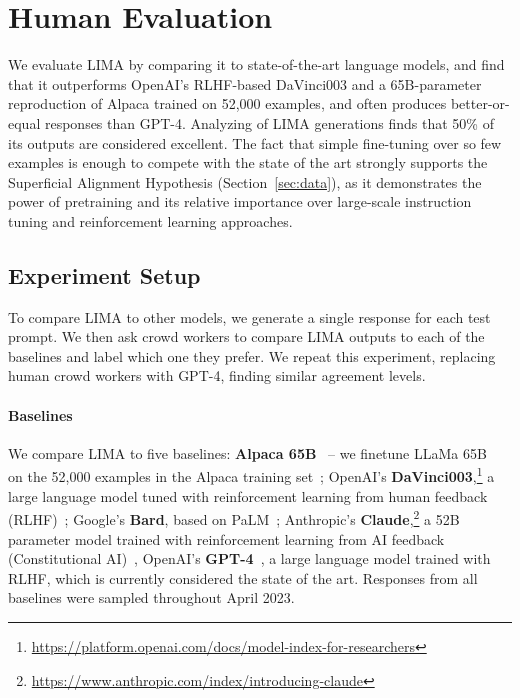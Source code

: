 \documentclass{article}
\newcommand\hypothesis{Superficial Alignment Hypothesis}
\begin{document}
\section{Human Evaluation}

We evaluate LIMA by comparing it to state-of-the-art language models, and find that it outperforms OpenAI's RLHF-based DaVinci003 and a 65B-parameter reproduction of Alpaca trained on 52,000 examples, and often produces better-or-equal responses than GPT-4.
Analyzing of LIMA generations finds that 50\% of its outputs are considered excellent.
The fact that simple fine-tuning over so few examples is enough to compete with the state of the art strongly supports the \hypothesis{} (Section~\ref{sec:data}), as it demonstrates the power of pretraining and its relative importance over large-scale instruction tuning and reinforcement learning approaches.

\subsection{Experiment Setup}

To compare LIMA to other models, we generate a single response for each test prompt.
We then ask crowd workers to compare LIMA outputs to each of the baselines and label which one they prefer.
We repeat this experiment, replacing human crowd workers with GPT-4, finding similar agreement levels.

\paragraph{Baselines}
We compare LIMA to five baselines:
\textbf{Alpaca 65B}~\citep{alpaca} -- we finetune LLaMa 65B~\citep{touvron2023llama} on the 52,000 examples in the Alpaca training set~\citep{alpaca};
OpenAI's \textbf{DaVinci003},\footnote{\url{https://platform.openai.com/docs/model-index-for-researchers}} a large language model tuned with reinforcement learning from human feedback (RLHF)~\citep{ouyang2022training};
Google's \textbf{Bard}, based on PaLM~\citep{chowdhery2022palm};
Anthropic's \textbf{Claude},\footnote{\url{https://www.anthropic.com/index/introducing-claude}} a 52B parameter model trained with reinforcement learning from AI feedback (Constitutional AI)~\cite{bai2022constitutional},
OpenAI's \textbf{GPT-4}~\citep{openai2023gpt4}, a large language model trained with RLHF, which is currently considered the state of the art.
Responses from all baselines were sampled throughout April 2023.
\end{document}
